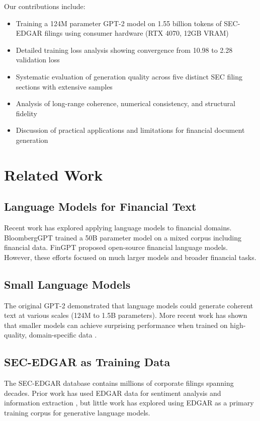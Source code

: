 \documentclass[12pt]{article}
\begin{document}
Our contributions include:
\begin{itemize}
    \item Training a 124M parameter GPT-2 model on 1.55 billion tokens of SEC-EDGAR filings using consumer hardware (RTX 4070, 12GB VRAM)
    \item Detailed training loss analysis showing convergence from 10.98 to 2.28 validation loss
    \item Systematic evaluation of generation quality across five distinct SEC filing sections with extensive samples
    \item Analysis of long-range coherence, numerical consistency, and structural fidelity
    \item Discussion of practical applications and limitations for financial document generation
\end{itemize}

\section{Related Work}

\subsection{Language Models for Financial Text}

Recent work has explored applying language models to financial domains. BloombergGPT \cite{bloomberggpt} trained a 50B parameter model on a mixed corpus including financial data. FinGPT \cite{fingpt} proposed open-source financial language models. However, these efforts focused on much larger models and broader financial tasks.

\subsection{Small Language Models}

The original GPT-2 \cite{gpt2} demonstrated that language models could generate coherent text at various scales (124M to 1.5B parameters). More recent work has shown that smaller models can achieve surprising performance when trained on high-quality, domain-specific data \cite{tinystories}.

\subsection{SEC-EDGAR as Training Data}

The SEC-EDGAR database contains millions of corporate filings spanning decades. Prior work has used EDGAR data for sentiment analysis \cite{edgar-sentiment} and information extraction \cite{edgar-extraction}, but little work has explored using EDGAR as a primary training corpus for generative language models.
\end{document}
